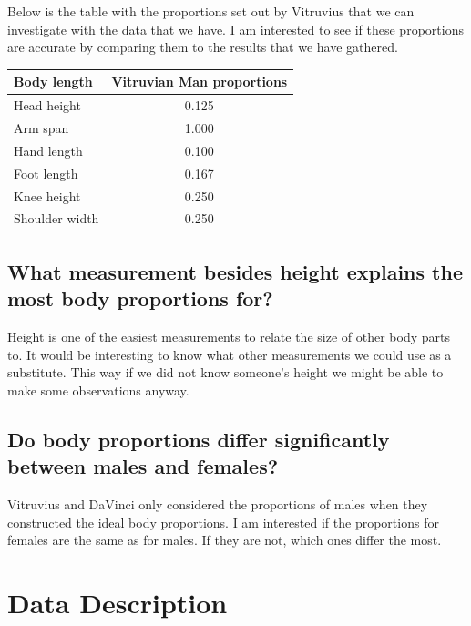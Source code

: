\documentclass[]{article}
\begin{document}
Below is the table with the proportions set out by Vitruvius that we can
investigate with the data that we have. I am interested to see if these
proportions are accurate by comparing them to the results that we have
gathered.

\begin{center}
\begin{tabular}{ l c}
  \label{tab:vitruvian-props}
  \textbf{Body length} & \textbf{Vitruvian Man proportions}\\
  \hline
  Head height & 0.125\\
  Arm span & 1.000\\
  Hand length & 0.100\\
  Foot length & 0.167\\
  Knee height & 0.250\\
  Shoulder width & 0.250\\
\end{tabular}
\end{center}
\subsection{What measurement besides height explains the most body proportions for?}
\label{sec:rq2}

Height is one of the easiest measurements to relate the size of other
body parts to. It would be interesting to know what other measurements
we could use as a substitute. This way if we did not know someone's
height we might be able to make some observations anyway.

\subsection{Do body proportions differ significantly between males and females?}

Vitruvius and DaVinci only considered the proportions of males when they
constructed the ideal body proportions. I am interested if the
proportions for females are the same as for males. If they are not,
which ones differ the most. \label{sec:rq3}

\section{Data Description}
\label{sec:data}
\end{document}
